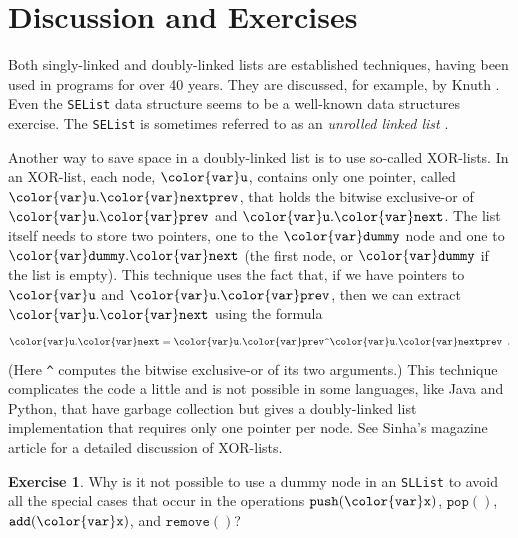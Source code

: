 \documentclass[10pt]{book}
\theoremstyle{plain}
\theoremstyle{definition}
\newtheorem{exc}{Exercise}[chapter]
\begin{document}
\section{Discussion and Exercises}

Both singly-linked and doubly-linked lists are established techniques,
having been used in programs for over 40 years.  They are discussed,
for example, by Knuth \cite[Sections~2.2.3--2.2.5]{k97v1}.  Even the
\texttt{SEList} data structure seems to be a well-known data structures exercise.
The \texttt{SEList} is sometimes referred to as an \emph{unrolled linked list}
\cite{sra94}.
%
%

Another way to save space in a doubly-linked list is to use 
so-called XOR-lists.
%
In an XOR-list, each node, \ensuremath{\mathtt{{\color{var}u}}}, contains only one
pointer, called \ensuremath{\mathtt{{\color{var}u}.{\color{var}nextprev}}}, that holds the bitwise exclusive-or of \ensuremath{\mathtt{{\color{var}u}.{\color{var}prev}}}
and \ensuremath{\mathtt{{\color{var}u}.{\color{var}next}}}.  The list itself needs to store two pointers, one to the \ensuremath{\mathtt{{\color{var}dummy}}}
node and one to \ensuremath{\mathtt{{\color{var}dummy}.{\color{var}next}}} (the first node, or \ensuremath{\mathtt{{\color{var}dummy}}} if the list is
empty). This technique uses the fact that, if we have pointers to \ensuremath{\mathtt{{\color{var}u}}}
and \ensuremath{\mathtt{{\color{var}u}.{\color{var}prev}}}, then we can extract \ensuremath{\mathtt{{\color{var}u}.{\color{var}next}}} using the formula
\[
   \ensuremath{\mathtt{{\color{var}u}.{\color{var}next}}} = \ensuremath{\mathtt{{\color{var}u}.{\color{var}prev}}} \verb+^+ \ensuremath{\mathtt{{\color{var}u}.{\color{var}nextprev}}} \enspace .
\]
(Here \verb+^+ computes the bitwise exclusive-or of its two arguments.)
This technique complicates the code a little and is not possible in
some languages, like Java and Python, that have garbage collection but gives a
doubly-linked list implementation that requires only one pointer per node.
See Sinha's magazine article \cite{s04} for a detailed discussion of
XOR-lists.

\begin{exc}
  Why is it not possible to use a dummy node in an \texttt{SLList} to avoid
  all the special cases that occur in the operations \ensuremath{\mathtt{push({\color{var}x})}}, \ensuremath{\mathtt{pop()}},
  \ensuremath{\mathtt{add({\color{var}x})}}, and \ensuremath{\mathtt{remove()}}?
\end{exc}
\end{document}
